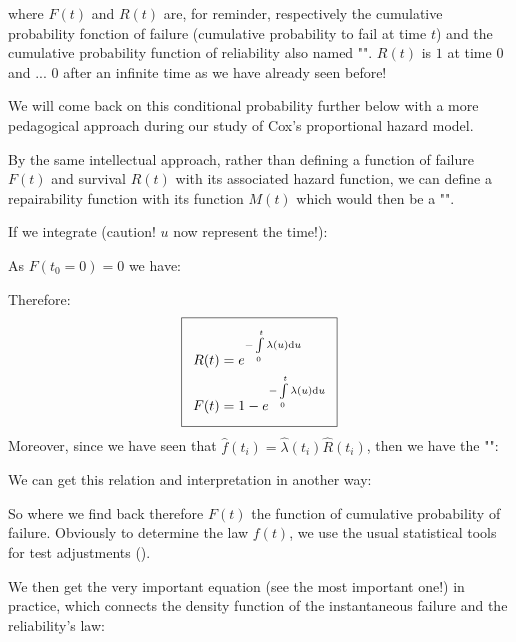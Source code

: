 	where $F(t)$ and $R(t)$ are, for reminder, respectively the cumulative probability fonction of failure (cumulative probability to fail at time $t$) and the cumulative probability function of reliability also named "". $R (t)$ is $1$ at time $0$ and ... $0$ after an infinite time as we have already seen before!
	
	We will come back on this conditional probability further below with a more pedagogical approach during our study of Cox's proportional hazard model.
	
	\begin{tcolorbox}[title=Remark,colframe=black,arc=10pt]
	By the same intellectual approach, rather than defining a function of failure $F(t)$ and survival $R(t)$ with its associated hazard function, we can define a repairability function with its function $M(t)$ which would then be a "".
	\end{tcolorbox}
	If we integrate (caution! $u$ now represent the time!):
	
	As $F(t_0=0)=0$ we have:
	
	Therefore:
	\begin{equation}
  \addtolength{\fboxsep}{5pt}
   \boxed{
   \begin{gathered}
   		\begin{aligned}
		R(t)&=e^{-\int\limits_0^t\lambda(u)\mathrm{d}u}\\
		F(t)&= 1 - e^{-\int\limits_0^t\lambda(u)\mathrm{d}u}
   		\end{aligned}
   \end{gathered}
   }
	\end{equation}
		Moreover, since we have seen that $\hat{f}(t_i)=\hat{\lambda}(t_i)\hat{R}(t_i)$, then we have the "":
	
	We can get this relation and interpretation in another way:
	
	So where we find back therefore $F (t)$ the function of cumulative probability of failure. Obviously to determine the law $f (t)$, we use the usual statistical tools for test adjustments ().
	
	We then get the very important equation (see the most important one!) in practice, which connects the density function of the instantaneous failure and the reliability's law:
	
